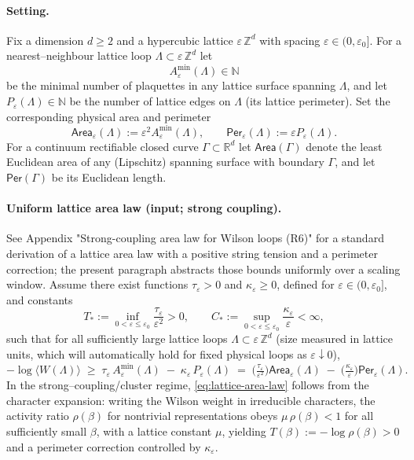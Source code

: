\documentclass[11pt]{amsart}
\theoremstyle{plain}
\theoremstyle{definition}
\theoremstyle{remark}
\begin{document}
\paragraph{Setting.}
Fix a dimension $d\ge 2$ and a hypercubic lattice $\varepsilon\,\mathbb{Z}^d$ with spacing $\varepsilon\in(0,\varepsilon_0]$. For a nearest--neighbour lattice loop $\Lambda\subset\varepsilon\,\mathbb{Z}^d$ let
\[
  A_\varepsilon^{\min}(\Lambda)\in\mathbb{N}
\]
be the minimal number of plaquettes in any lattice surface spanning $\Lambda$, and let $P_\varepsilon(\Lambda)\in\mathbb{N}$ be the number of lattice edges on $\Lambda$ (its lattice perimeter). Set the corresponding physical area and perimeter
\[
  \mathsf{Area}_\varepsilon(\Lambda):=\varepsilon^2 A_\varepsilon^{\min}(\Lambda),\qquad
  \mathsf{Per}_\varepsilon(\Lambda):=\varepsilon P_\varepsilon(\Lambda).
\]
For a continuum rectifiable closed curve $\Gamma\subset\mathbb{R}^d$ let $\mathsf{Area}(\Gamma)$ denote the least Euclidean area of any (Lipschitz) spanning surface with boundary $\Gamma$, and let $\mathsf{Per}(\Gamma)$ be its Euclidean length.

\paragraph{Uniform lattice area law (input; strong coupling).}
See Appendix "Strong-coupling area law for Wilson loops (R6)" for a standard derivation of a lattice area law with a positive string tension and a perimeter correction; the present paragraph abstracts those bounds uniformly over a scaling window.
Assume there exist functions $\tau_\varepsilon>0$ and $\kappa_\varepsilon\ge 0$, defined for $\varepsilon\in (0,\varepsilon_0]$, and constants
\[
  T_*:=\inf_{0<\varepsilon\le\varepsilon_0}\frac{\tau_\varepsilon}{\varepsilon^2}>0,\qquad
  C_*:=\sup_{0<\varepsilon\le\varepsilon_0}\frac{\kappa_\varepsilon}{\varepsilon}<\infty,
\]
such that for all sufficiently large lattice loops $\Lambda\subset\varepsilon\,\mathbb{Z}^d$ (size measured in lattice units, which will automatically hold for fixed physical loops as $\varepsilon\downarrow 0$),
\begin{equation}
\label{eq:lattice-area-law}
  -\log\langle W(\Lambda)\rangle \;\ge\; \tau_\varepsilon\,A_\varepsilon^{\min}(\Lambda)\;-
  \;\kappa_\varepsilon\,P_\varepsilon(\Lambda)
  \;=\;\Big(\tfrac{\tau_\varepsilon}{\varepsilon^2}\Big)\mathsf{Area}_\varepsilon(\Lambda)\;-
  \;\Big(\tfrac{\kappa_\varepsilon}{\varepsilon}\Big)\mathsf{Per}_\varepsilon(\Lambda).
\end{equation}
In the strong--coupling/cluster regime, \eqref{eq:lattice-area-law} follows from the character expansion: writing the Wilson weight in irreducible characters, the activity ratio $\rho(\beta)$ for nontrivial representations obeys $\mu\,\rho(\beta) < 1$ for all sufficiently small $\beta$, with a lattice constant $\mu$, yielding $T(\beta):= -\log \rho(\beta) > 0$ and a perimeter correction controlled by $\kappa_\varepsilon$.
\end{document}
